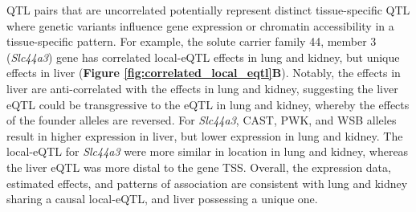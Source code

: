 \documentclass[9pt,twocolumn,twoside]{gsajnl}
\begin{document}
QTL pairs that are uncorrelated potentially represent distinct tissue-specific QTL where genetic variants influence gene expression or chromatin accessibility in a tissue-specific pattern. For example, the solute carrier family 44, member 3 (\textit{Slc44a3}) gene has correlated local-eQTL effects in lung and kidney, but unique effects in liver (\textbf{Figure \ref{fig:correlated_local_eqtl}B}). Notably, the effects in liver are anti-correlated with the effects in lung and kidney, suggesting the liver eQTL could be transgressive \citep{Rieseberg1999} to the eQTL in lung and kidney, whereby the effects of the founder alleles are reversed. For \textit{Slc44a3}, CAST, PWK, and WSB alleles result in higher expression in liver, but lower expression in lung and kidney. 
The local-eQTL for \textit{Slc44a3} were more similar in location in lung and kidney, whereas the liver eQTL was more distal to the gene TSS. Overall, the expression data, estimated effects, and patterns of association are consistent with lung and kidney sharing a causal local-eQTL, and liver possessing a unique one. 
\end{document}
